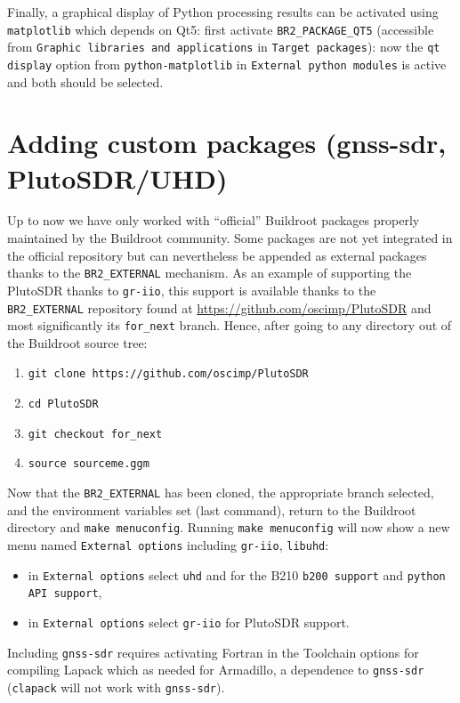 \documentclass[a4paper]{article}
\begin{document}
Finally, a graphical display of Python processing results can be activated using
{\tt matplotlib} which depends on Qt5: first activate {\tt BR2\_PACKAGE\_QT5} (accessible
from {\tt Graphic libraries and applications} in {\tt Target packages}): now the
{\tt qt display} option from {\tt python-matplotlib} in {\tt External python modules} is
active and both should be selected.

\section{Adding custom packages (gnss-sdr, PlutoSDR/UHD)}

Up to now we have only worked with ``official'' Buildroot packages properly maintained by
the Buildroot community. Some packages are not yet integrated in the official repository
but can nevertheless be appended as external packages thanks to the {\tt BR2\_EXTERNAL}
mechanism. As an example of supporting the PlutoSDR thanks to {\tt gr-iio}, this support
is available thanks to the {\tt BR2\_EXTERNAL} repository found at 
\url{https://github.com/oscimp/PlutoSDR} and most significantly its {\tt for\_next} branch.
Hence, after going to any directory out of the Buildroot source tree:
\begin{enumerate}
\item \verb~git clone https://github.com/oscimp/PlutoSDR~
\item \verb~cd PlutoSDR~
\item \verb~git checkout for_next~
\item \verb~source sourceme.ggm~
\end{enumerate}

Now that the {\tt BR2\_EXTERNAL} has been cloned, the appropriate branch selected, and the
environment variables set (last command), return to the Buildroot directory and
{\tt make menuconfig}. Running {\tt make menuconfig} will now show a new menu named 
{\tt External options} including
{\tt gr-iio}, {\tt libuhd}:
\begin{itemize}
\item in {\tt External options} select {\tt uhd} and for the B210 {\tt b200 support} and 
{\tt python API support}, 
\item in {\tt External options} select {\tt gr-iio} for PlutoSDR support.
\end{itemize}

Including {\tt gnss-sdr} requires activating Fortran in the Toolchain options for compiling 
Lapack which as needed for Armadillo, a dependence to {\tt gnss-sdr} ({\tt clapack} will not work 
with {\tt gnss-sdr}).
\end{document}
